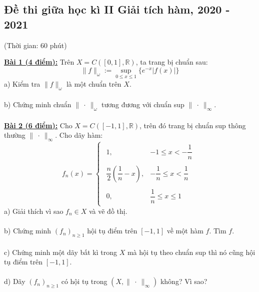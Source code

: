 \documentclass[10pt, a4paper]{article}
\begin{document}
\newpage

\subsection{Đề thi giữa học kì II Giải tích hàm, 2020 - 2021}
\begin{center}
	\color{blue}(Thời gian: 60 phút)
\end{center}
\color{red}\underline{\textbf{Bài 1 (4 điểm):}} \color{black} Trên $X=C([0,1],\mathbb R)$, ta trang bị chuẩn sau: $$\lVert f\rVert_\omega:=\displaystyle\sup_{0\le x\le1}\{e^{-x}|f(x)|\}$$
\color{red}a) \color{black}Kiểm tra $\lVert f\rVert_\omega$ là một chuẩn trên $X$.\\\\
\color{red}b) \color{black}Chứng minh chuẩn $\lVert~\cdot~\rVert_\omega$ tương đương với chuẩn sup $\lVert~\cdot~\rVert_\infty$.\\\\
\color{red}\underline{\textbf{Bài 2 (6 điểm):}} \color{black} Cho $X=C([-1,1],\mathbb R)$, trên đó trang bị chuẩn sup thông thường $\lVert~\cdot~\rVert_\infty$. Cho dãy hàm: $$f_n(x)=\begin{cases}
\begin{array}{ll}
	1, & -1\le x<-\dfrac1n\\\\
	\dfrac n2\left(\dfrac1n-x\right), & -\dfrac1n\le x<\dfrac1n\\\\
	0, & \dfrac1n\le x\le1
\end{array}
\end{cases}$$
\color{red}a) \color{black}Giải thích vì sao $f_n\in X$ và vẽ đồ thị.\\\\
\color{red}b) \color{black}Chứng minh $(f_n)_{n\ge1}$ hội tụ điểm trên $[-1,1]$ về một hàm $f$. Tìm $f$.\\\\
\color{red}c) \color{black}Chứng minh một dãy bất kì trong $X$ mà hội tụ theo chuẩn sup thì nó cũng hội tụ điểm trên $[-1,1]$.\\\\
\color{red}d) \color{black}Dãy $(f_n)_{n\ge1}$ có hội tụ trong $\left(X,\lVert~\cdot~\rVert_\infty\right)$ không? Vì sao?

\newpage
 
\end{document}
